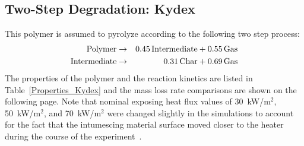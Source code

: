 \clearpage

\subsection{Two-Step Degradation: Kydex}

This polymer is assumed to pyrolyze according to the following two step process:
\begin{eqnarray}
   \hbox{Polymer}       &\to& 0.45 \, \hbox{Intermediate} + 0.55 \, \hbox{Gas}  \label{reac1of2} \\
   \hbox{Intermediate}  &\to& 0.31 \, \hbox{Char} +         0.69 \, \hbox{Gas}  \label{reac2of2}
\end{eqnarray}
The properties of the polymer and the reaction kinetics are listed in Table~\ref{Properties_Kydex} and the mass loss rate comparisons are shown on the following page. Note that nominal exposing heat flux values of 30~kW/m$^2$, 50~kW/m$^2$, and 70~kW/m$^2$ were changed slightly in the simulations to account for the fact that the intumescing material surface moved closer to the heater during the course of the experiment~\cite{Li:PDS_2015}.

